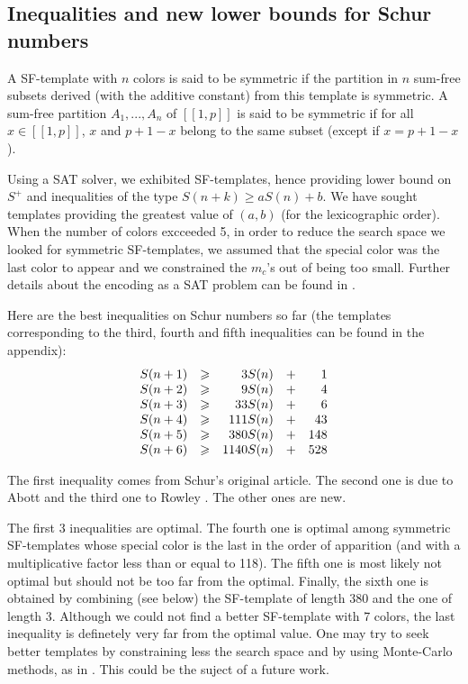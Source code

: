 \subsection{Inequalities and new lower bounds for Schur numbers}

\begin{definition}
A SF-template with \(n\) colors is said to be symmetric if the partition in \(n\) sum-free subsets derived (with the additive constant) from this template is symmetric. 
A sum-free partition \(A_1, ..., A_n\) of \([\![1, p]\!]\) is said to be symmetric if for all \( x \in [\![1, p]\!]\), \(x\) and \(p + 1 - x\) belong to the same subset 
(except if \(x = p + 1 - x\)).
\end{definition}

Using a SAT solver, we exhibited SF-templates, hence providing lower bound on \(S^+\) and inequalities 
of the type \(S(n+k) \geqslant a S(n) + b\). We have sought templates providing the greatest value of 
\((a, b)\) (for the lexicographic order). When the number of colors excceeded 5, in order to reduce the search space we 
looked for symmetric SF-templates, we assumed that the special color was the last color to appear and we constrained 
the \(m_c\)'s out of being too small. Further details about the encoding as a SAT problem can be found in \cite{Heule2017}.

\par
Here are the best inequalities on Schur numbers so far (the templates corresponding to the third, fourth and fifth 
inequalities can be found in the appendix):
\[
\begin{array}{r r r r r}
	S(n + 1) & \geqslant & 3 S(n) & + & 1 \\
	S(n + 2) & \geqslant & 9 S(n) & + & 4 \\
	S(n + 3) & \geqslant & 33 S(n) & + & 6 \\
	S(n + 4) & \geqslant & 111 S(n) & + & 43 \\
	S(n + 5) & \geqslant & 380 S(n) & + & 148 \\
	S(n + 6) & \geqslant & 1140 S(n) & + & 528 \\
\end{array}
\]

The first inequality comes from  Schur's original article\cite{Schur1917}. The second one is due to
Abott \cite{AbbottHanson}
and the third one to Rowley \cite{RowleyRamsey}. The other ones are new.

\par
The first 3 inequalities are optimal. The fourth one is optimal among symmetric SF-templates whose special color is 
the last in the order of apparition (and with a multiplicative factor less than or equal to 118). The fifth one is most 
likely not optimal but should not be too far from the optimal. 
Finally, the sixth one is obtained by combining (see below) the SF-template of length 380 and the one of length 3. 
Although we could not find a better SF-template with 7 colors, the last inequality is definetely very far from the 
optimal value. One may try to seek better templates by constraining less the search space and by using 
Monte-Carlo methods, as in \cite{Bouzy2015AnAP}. This could be the suject of a future work.

